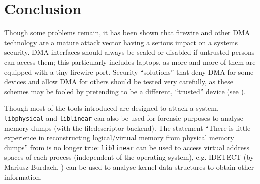 %
%

\section{Conclusion}

Though some problems remain, it has been shown that firewire and other DMA
technology are a mature attack vector having a serious impact on a systems
security. DMA interfaces should always be sealed or disabled if untrusted
persons can access them; this particularly includes laptops, as more and more of
them are equipped with a tiny firewire port.  Security ``solutions'' that deny
DMA for some devices and allow DMA for others should be tested very carefully,
as these schemes may be fooled by pretending to be a different, ``trusted''
device (see \cite{rux2k6firewire:2006}).

Though most of the tools introduced are designed to attack a system,
\texttt{libphysical} and \texttt{liblinear} can also be used for forensic
purposes to analyse memory dumps (with the filedescriptor backend). The
statement ``There is little experience in reconstructing logical/virtual memory
from physical memory dumps'' from \cite{cansecwest_firewire:2005} is no longer
true: \texttt{liblinear} can be used to access virtual address spaces of each
process (independent of the operating system), e.g. IDETECT (by Mariusz Burdach,
\cite{finding_digital_evidence_in_physical_memory:2006}) can be used to analyse
kernel data structures to obtain other information.

